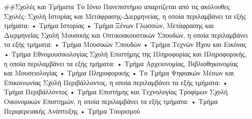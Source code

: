 \#\#Σχολές και Τμήματα Το Ιόνιο Πανεπιστήμιο απαρτίζεται από τις
ακόλουθες Σχολές: Σχολή Ιστορίας και Μετάφρασης-Διερμηνείας, η οποία
περιλαμβάνει τα εξής τμήματα: • Τμήμα Ιστορίας • Τμήμα Ξένων Γλωσσών,
Μετάφρασης και Διερμηνείας Σχολή Μουσικής και Οπτικοακουστικών Σπουδών,
η οποία περιλαμβάνει τα εξής τμήματα: • Τμήμα Μουσικών Σπουδών • Τμήμα
Τεχνών Ήχου και Εικόνας • Τμήμα Εθνομουσικολογίας Σχολή Επιστήμης της
Πληροφορίας και Πληροφορικής, η οποία περιλαμβάνει τα εξής τμήματα: •
Τμήμα Aρχειονομίας, Bιβλιοθηκονομίας και Μουσειολογίας • Τμήμα
Πληροφορικής • Το Τμήμα Ψηφιακών Μέσων και Επικοινωνίας Σχολή
Περιβάλλοντος, η οποία περιλαμβάνει τα εξής τμήματα: • Τμήμα
Περιβάλλοντος • Τμήμα Επιστήμης και Τεχνολογίας Τροφίμων Σχολή
Οικονομικών Επιστημών, η οποία περιλαμβάνει τα εξής τμήματα: • Τμήμα
Περιφερειακής Ανάπτυξης • Τμήμα Τουρισμού
